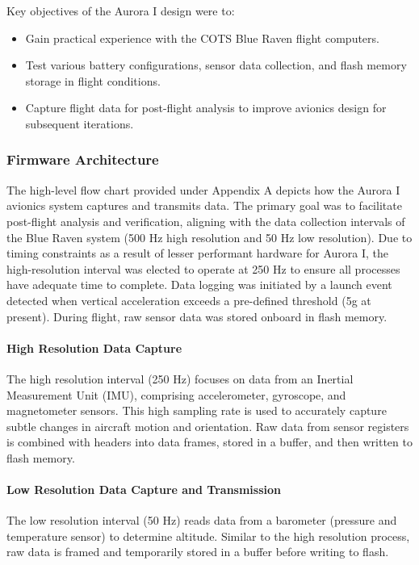 Key objectives of the Aurora I design were to:

\begin{itemize}
    \item Gain practical experience with the COTS Blue Raven flight computers.
    \item Test various battery configurations, sensor data collection, and flash memory storage in flight conditions.
    \item Capture flight data for post-flight analysis to improve avionics design for subsequent iterations.
\end{itemize}

\subsubsection{Firmware Architecture}
The high-level flow chart provided under Appendix A depicts how the Aurora I avionics system captures and transmits data. The primary goal was to facilitate post-flight analysis and verification, aligning with the data collection intervals of the Blue Raven system (500 Hz high resolution and 50 Hz low resolution). Due to timing constraints as a result of lesser performant hardware for Aurora I, the high-resolution interval was elected to operate at 250 Hz to ensure all processes have adequate time to complete. Data logging was initiated by a launch event detected when vertical acceleration exceeds a pre-defined threshold (5g at present). During flight, raw sensor data was stored onboard in flash memory. 

\paragraph{High Resolution Data Capture}

The high resolution interval (250 Hz) focuses on data from an Inertial Measurement Unit (IMU), comprising accelerometer, gyroscope, and magnetometer sensors. This high sampling rate is used to accurately capture subtle changes in aircraft motion and orientation. Raw data from sensor registers is combined with headers into data frames, stored in a buffer, and then written to flash memory. 

\paragraph{Low Resolution Data Capture and Transmission}

The low resolution interval (50 Hz) reads data from a barometer (pressure and temperature sensor) to determine altitude. Similar to the high resolution process, raw data is framed and temporarily stored in a buffer before writing to flash.  

